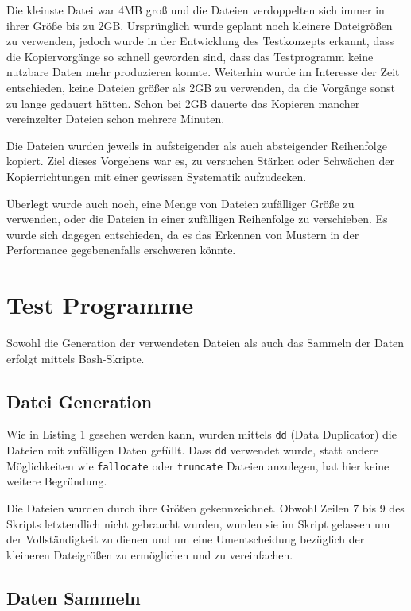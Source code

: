 \documentclass[11pt,parskip=full]{scrartcl}
\begin{document}
	Die kleinste Datei war 4MB groß und die Dateien verdoppelten sich immer in ihrer Größe bis zu 2GB. Ursprünglich wurde geplant noch kleinere Dateigrößen zu verwenden, jedoch wurde in der Entwicklung des Testkonzepts erkannt, dass die Kopiervorgänge so schnell geworden sind, dass das Testprogramm keine nutzbare Daten mehr produzieren konnte. Weiterhin wurde im Interesse der Zeit entschieden, keine Dateien größer als 2GB zu verwenden, da die Vorgänge sonst zu lange gedauert hätten. Schon bei 2GB dauerte das Kopieren mancher vereinzelter Dateien schon mehrere Minuten.
	
	Die Dateien wurden jeweils in aufsteigender als auch absteigender Reihenfolge kopiert. Ziel dieses Vorgehens war es, zu versuchen Stärken oder Schwächen der Kopierrichtungen mit einer gewissen Systematik aufzudecken.
	
	Überlegt wurde auch noch, eine Menge von Dateien zufälliger Größe zu verwenden, oder die Dateien in einer zufälligen Reihenfolge zu verschieben. Es wurde sich dagegen entschieden, da es das Erkennen von Mustern in der Performance gegebenenfalls erschweren könnte.
	

\section{Test Programme}
	Sowohl die Generation der verwendeten Dateien als auch das Sammeln der Daten erfolgt mittels Bash-Skripte.
\subsection{Datei Generation}
	Wie in Listing 1 gesehen werden kann, wurden mittels \lstinline|dd| (Data Duplicator) die Dateien mit zufälligen Daten gefüllt. Dass \lstinline|dd| verwendet wurde, statt andere Möglichkeiten wie \lstinline|fallocate| oder \lstinline|truncate| Dateien anzulegen, hat hier keine weitere Begründung.
	
	Die Dateien wurden durch ihre Größen gekennzeichnet. Obwohl Zeilen 7 bis 9 des Skripts letztendlich nicht gebraucht wurden, wurden sie im Skript gelassen um der Vollständigkeit zu dienen und um eine Umentscheidung bezüglich der kleineren Dateigrößen zu ermöglichen und zu vereinfachen.
	
	
\subsection{Daten Sammeln}
\end{document}
